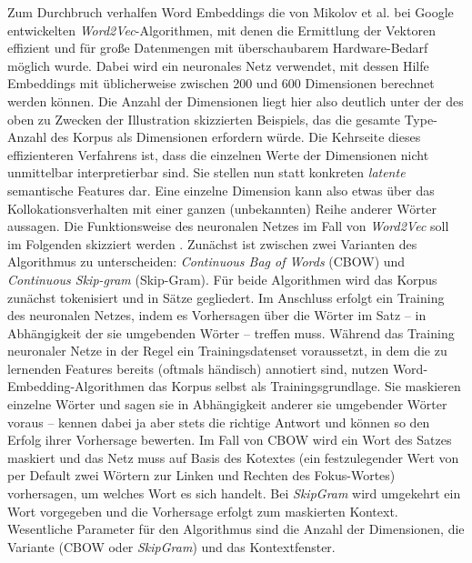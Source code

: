 



Zum Durchbruch verhalfen Word Embeddings die von Mikolov et al. \autocite*{mikolovEfficientEstimationWord2013} bei Google entwickelten \emph{Word2Vec}-Algorithmen, mit denen die Ermittlung der Vektoren effizient und für große Datenmengen mit überschaubarem Hardware-Bedarf möglich wurde. Dabei wird ein neuronales Netz verwendet, mit dessen Hilfe Embeddings mit üblicherweise zwischen 200 und 600 Dimensionen berechnet werden können. Die Anzahl der Dimensionen liegt hier also deutlich unter der des oben zu Zwecken der Illustration skizzierten Beispiels, das die gesamte Type-Anzahl des Korpus als Dimensionen erfordern würde. Die Kehrseite dieses effizienteren Verfahrens ist, dass die einzelnen Werte der Dimensionen nicht unmittelbar interpretierbar sind. Sie stellen nun statt konkreten \emph{latente} semantische Features dar. Eine einzelne Dimension kann also etwas über das Kollokationsverhalten mit einer ganzen (unbekannten) Reihe anderer Wörter aussagen. Die Funktionsweise des neuronalen Netzes im Fall von \emph{Word2Vec} \autocite{mikolovEfficientEstimationWord2013} soll im Folgenden skizziert werden \autocite[siehe ausführlich][]{rongWord2vecParameterLearning2016}. Zunächst ist zwischen zwei Varianten des Algorithmus zu unterscheiden: \emph{Continuous Bag of Words} (CBOW) und \emph{Continuous Skip-gram} (Skip-Gram). Für beide Algorithmen wird das Korpus zunächst tokenisiert und in Sätze gegliedert. Im Anschluss erfolgt ein Training des neuronalen Netzes, indem es Vorhersagen über die Wörter im Satz -- in Abhängigkeit der sie umgebenden Wörter -- treffen muss. Während das Training neuronaler Netze in der Regel ein Trainingsdatenset voraussetzt, in dem die zu lernenden Features bereits (oftmals händisch) annotiert sind, nutzen Word-Embedding-Algorithmen das Korpus selbst als Trainingsgrundlage. Sie maskieren einzelne Wörter und sagen sie in Abhängigkeit anderer sie umgebender Wörter voraus -- kennen dabei ja aber stets die richtige Antwort und können so den Erfolg ihrer Vorhersage bewerten. Im Fall von CBOW wird ein Wort des Satzes maskiert und das Netz muss auf Basis des Kotextes (ein festzulegender Wert von per Default zwei Wörtern zur Linken und Rechten des Fokus-Wortes) vorhersagen, um welches Wort es sich handelt. Bei \emph{SkipGram} wird umgekehrt ein Wort vorgegeben und die Vorhersage erfolgt zum maskierten Kontext. Wesentliche Parameter für den Algorithmus sind die Anzahl der Dimensionen, die Variante (CBOW oder \emph{SkipGram}) und das Kontextfenster. 